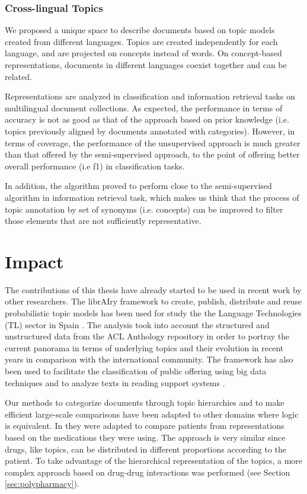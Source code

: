 \subsubsection{Cross-lingual Topics}

We proposed a unique space to describe documents based on topic models created from different languages. Topics are created independently for each language, and are projected on concepts instead of words. On concept-based representations, documents in different languages coexist together and can be related.

Representations are analyzed in classification and information retrieval tasks on multilingual document collections. As expected, the performance in terms of accuracy is not as good as that of the approach based on prior knowledge (i.e. topics previously aligned by documents annotated with categories). However, in terms of coverage, the performance of the unsupervised approach is much greater than that offered by the semi-supervised approach, to the point of offering better overall performance (i.e f1) in classification tasks. 

In addition, the algorithm proved to perform close to the semi-supervised algorithm in information retrieval task, which makes us think that the process of topic annotation by set of synonyms (i.e. concepts) can be improved to filter those elements that are not sufficiently representative.


\section{Impact}

The contributions of this thesis have already started to be used in recent work by other researchers. The librAIry framework to create, publish, distribute and reuse probabilistic topic models has been used for study the the Language Technologies (TL) sector in Spain \citep{Samy2019}. The analysis took into account  the structured and unstructured data from the ACL Anthology repository in order to portray the current panorama in terms of underlying topics and their evolution in recent years in comparison with the international community. The framework has also been used to facilitate the classification of public offering using big data techniques \citep{Olga2019} and to analyze texts in reading support systems \citep{Teresa2020}.

Our methods to categorize documents through topic hierarchies and to make efficient large-scale comparisons  have been adapted to other domains where logic is equivalent. In \citep{Badenes-Olmedo2019c} they were adapted to compare patients from representations based on the medications they were using. The approach is very similar since drugs, like topics, can be distributed in different proportions according to the patient. To take advantage of the hierarchical representation of the topics, a more complex approach based on drug-drug interactions was performed (see Section \ref{sec:polypharmacy}).

